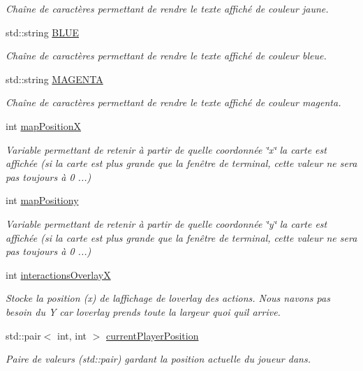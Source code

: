 \begin{DoxyCompactItemize}
\begin{DoxyCompactList}\small\item\em Chaîne de caractères permettant de rendre le texte affiché de couleur jaune. \end{DoxyCompactList}\item 
std\+::string \hyperlink{namespaceio_aad76ed62886e76ca53a755d1c917e387}{B\+L\+UE}
\begin{DoxyCompactList}\small\item\em Chaîne de caractères permettant de rendre le texte affiché de couleur bleue. \end{DoxyCompactList}\item 
std\+::string \hyperlink{namespaceio_a1e4a43cea85f576e62aebce6aabc60b5}{M\+A\+G\+E\+N\+TA}
\begin{DoxyCompactList}\small\item\em Chaîne de caractères permettant de rendre le texte affiché de couleur magenta. \end{DoxyCompactList}\item 
int \hyperlink{namespaceio_a7f2af984af03881a45da957db2c48be2}{map\+PositionX}
\begin{DoxyCompactList}\small\item\em Variable permettant de retenir à partir de quelle coordonnée \char`\"{}x\char`\"{} la carte est affichée (si la carte est plus grande que la fenêtre de terminal, cette valeur ne sera pas toujours à 0 ...) \end{DoxyCompactList}\item 
int \hyperlink{namespaceio_aa0322ffa705df7bd3c4fa5eaefde5d6d}{map\+Positiony}
\begin{DoxyCompactList}\small\item\em Variable permettant de retenir à partir de quelle coordonnée \char`\"{}y\char`\"{} la carte est affichée (si la carte est plus grande que la fenêtre de terminal, cette valeur ne sera pas toujours à 0 ...) \end{DoxyCompactList}\item 
int \hyperlink{namespaceio_a89504a896bab20fea6328b3186d691ae}{interactions\+OverlayX}
\begin{DoxyCompactList}\small\item\em Stocke la position (x) de l\textquotesingle{}affichage de l\textquotesingle{}overlay des actions. Nous n\textquotesingle{}avons pas besoin du Y car l\textquotesingle{}overlay prends toute la largeur quoi qu\textquotesingle{}il arrive. \end{DoxyCompactList}\item 
std\+::pair$<$ int, int $>$ \hyperlink{namespaceio_a2a0c75ff7760b96fcf6e696efe3d1c51}{current\+Player\+Position}
\begin{DoxyCompactList}\small\item\em Paire de valeurs (std\+::pair) gardant la position actuelle du joueur dans. \end{DoxyCompactList}\end{DoxyCompactItemize}


